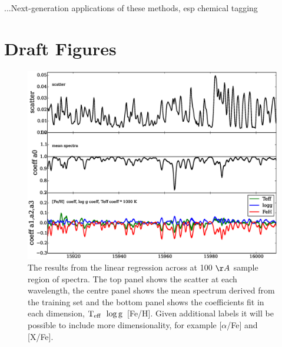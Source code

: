 \documentclass[12pt, preprint]{aastex}
\newcommand{\teff}{\mbox{$\rm T_{eff}$}}
\newcommand{\logg}{\mbox{$\rm \log g$}}
\begin{document}
...Next-generation applications of these methods, esp chemical tagging

\section{Draft Figures}



\begin{figure}[h!]
  \includegraphics[width=\hsize]{./plots/R1_example.eps}
\caption{The results from the linear regression across at 100 $\AA$ sample region of spectra. The top panel shows the scatter at each wavelength, the centre panel shows the mean spectrum derived from the training set and the bottom panel shows the coefficients fit in each dimension, \teff\, \logg\, [Fe/H]. Given additional labels it will be possible to include more dimensionality, for example [$\alpha$/Fe] and [X/Fe].}
\label{fig:fits}
\end{figure}
\end{document}
